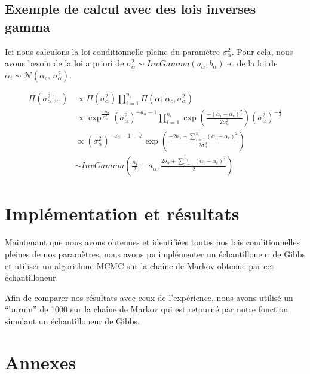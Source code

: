 \documentclass[
]{article}
\begin{document}
\hypertarget{exemple-de-calcul-avec-des-lois-inverses-gamma}{%
\subsection{Exemple de calcul avec des lois inverses
gamma}\label{exemple-de-calcul-avec-des-lois-inverses-gamma}}

Ici nous calculons la loi conditionnelle pleine du paramètre
\(\sigma_{\alpha}^2\). Pour cela, nous avons besoin de la loi a priori
de \(\sigma_{\alpha}^{2} \sim InvGamma(a_{\alpha},b_{\alpha})\) et de la
loi de
\(\alpha_{i} \sim \mathcal{N}(\alpha_{c},\,\sigma_{\alpha}^{2})\).

\begin{align*}
\Pi(\sigma_{\alpha}^{2}|...) &\propto \Pi(\sigma_{\alpha}^{2}) \prod_{i=1}^{n_{i}}\Pi(\alpha_{i}|\alpha_{c},\sigma_{\alpha}^{2}) \\
&\propto \exp^{\frac{-b_{\alpha}}{\sigma_{\alpha}^{2}}}(\sigma_{\alpha}^{2})^{-a_{\alpha}-1}\prod_{i=1}^{n_{i}} \exp\left(\frac{-(\alpha_{i}-\alpha_{c})^{2}}{2\sigma_{\alpha}^{2}}\right)(\sigma_{\alpha}^{2})^{-\frac{1}{2}}\\
&\propto (\sigma_{\alpha}^{2})^{-a_{\alpha}-1-\frac{n_{i}}{2}}\exp\left(\frac{-2b_{\alpha}-\sum\limits_{i=1}^{n_{i}}(\alpha_{i}-\alpha_{c})^{2}}{2\sigma_{\alpha}^{2}}\right)\\
&\sim InvGamma(\frac{n_{i}}{2}+a_{\alpha},\frac{2b_{\alpha}+\sum\limits_{i=1}^{n_{i}}(\alpha_{i}-\alpha_{c})^{2}}{2})
\end{align*}

\hypertarget{impluxe9mentation-et-ruxe9sultats}{%
\section{Implémentation et
résultats}\label{impluxe9mentation-et-ruxe9sultats}}

Maintenant que nous avons obtenues et identifiées toutes nos lois
conditionnelles pleines de nos paramètres, nous avons pu implémenter un
échantilloneur de Gibbs et utiliser un algorithme MCMC sur la chaîne de
Markov obtenue par cet échantilloneur.

Afin de comparer nos résultats avec ceux de l'expérience, nous avons
utilisé un ``burnin'' de 1000 sur la chaîne de Markov qui est retourné
par notre fonction simulant un échantilloneur de Gibbs.

\newpage

\hypertarget{annexes}{%
\section{Annexes}\label{annexes}}
\end{document}
